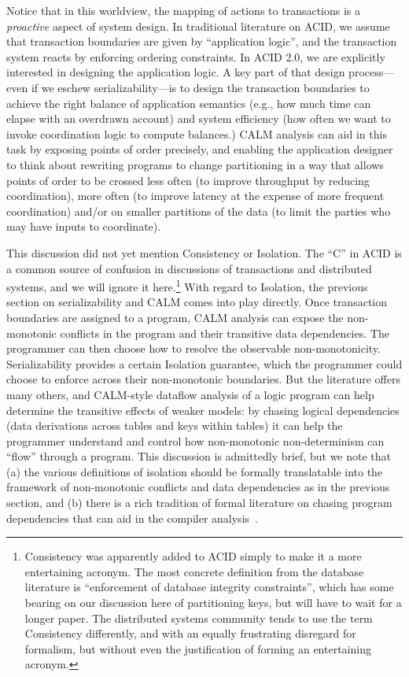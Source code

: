 \documentclass{sig-alternate}
\begin{document}
Notice that in this worldview, the mapping of actions to transactions is a \emph{proactive} aspect of system design.  In traditional literature on ACID, we assume that transaction boundaries are given by ``application logic'', and the transaction system reacts by enforcing ordering constraints.  In ACID 2.0, we are explicitly interested in designing the application logic.  A key part of that design process---even if we eschew serializability---is to design the transaction boundaries to achieve the right balance of application semantics (e.g., how much time can elapse with an overdrawn account) and system efficiency (how often we want to invoke coordination logic to compute balances.)  CALM analysis can aid in this task by exposing points of order precisely, and enabling the application designer to think about rewriting programs to change partitioning in a way that allows points of order to be crossed less often (to improve throughput by reducing coordination), more often (to improve latency at the expense of more frequent coordination) and/or on smaller partitions of the data (to limit the parties who may have inputs to coordinate).

This discussion did not yet mention Consistency or Isolation.  The ``C'' in ACID is a common source of confusion in discussions of transactions and distributed systems, and we will ignore it here.\footnote{Consistency was apparently added to ACID simply to make it a more entertaining acronym.  The most concrete definition from the database literature is ``enforcement of database integrity constraints'', which has some bearing on our discussion here of partitioning keys, but will have to wait for a longer paper.  The distributed systems community tends to use the term Consistency differently, and with an equally frustrating disregard for formalism, but without even the justification of forming an entertaining acronym.}  With regard to Isolation, the previous section on serializability and CALM comes into play directly.  Once transaction boundaries are assigned to a program, CALM analysis can expose the non-monotonic conflicts in the program and their transitive data dependencies.  The programmer can then choose how to resolve the observable non-monotonicity.  Serializability provides a certain Isolation guarantee, which the programmer could choose to enforce across their non-monotonic boundaries.  But the literature offers many others, and CALM-style dataflow analysis of a logic program can help determine the transitive effects of weaker models: by chasing logical dependencies (data derivations across tables and keys within tables) it can help the programmer understand and control how non-monotonic non-determinism can ``flow'' through a program.  This discussion is admittedly brief, but we note that (a) the various definitions of isolation should be formally translatable into the framework of non-monotonic conflicts and data dependencies as in the previous section, and (b) there is a rich tradition of formal literature on chasing program dependencies that can aid in the compiler analysis~\cite{alicebook}.
\end{document}
